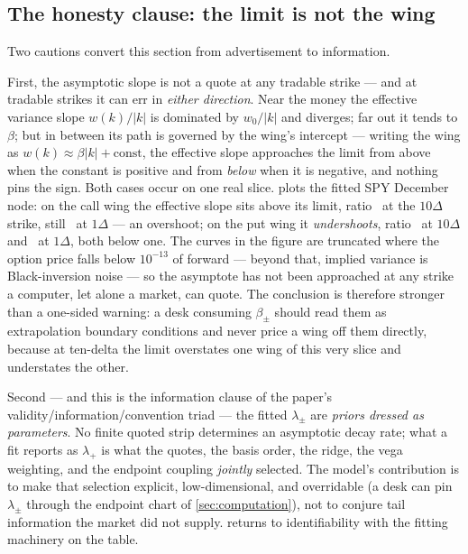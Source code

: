 \subsection{The honesty clause: the limit is not the wing}

Two cautions convert this section from advertisement to information.

First, the asymptotic slope is not a quote at any tradable strike ---
and at tradable strikes it can err in \emph{either direction}.  Near the
money the effective variance slope $w(k)/|k|$ is dominated by $w_0/|k|$
and diverges; far out it tends to $\beta$; but in between its path is
governed by the wing's intercept --- writing the wing as
$w(k)\approx\beta|k|+\text{const}$, the effective slope approaches the
limit from above when the constant is positive and from \emph{below}
when it is negative, and nothing pins the sign.  Both cases occur on one
real slice.   plots the fitted SPY December node: on the
call wing the effective slope sits above its limit, ratio
\MacLeeRatioTenDeltaCall\ at the $10\Delta$ strike, still
\MacLeeRatioOneDeltaCall\ at $1\Delta$ --- an overshoot; on the put wing
it \emph{undershoots}, ratio \MacLeeRatioTenDeltaPut\ at $10\Delta$ and
\MacLeeRatioOneDeltaPut\ at $1\Delta$, both below one.  The curves in
the figure are truncated where the option price falls below $10^{-13}$
of forward --- beyond that, implied variance is Black-inversion noise
--- so the asymptote has not been approached at any strike a computer,
let alone a market, can quote.  The conclusion is therefore stronger
than a one-sided warning: a desk consuming $\beta_\pm$ should read them
as extrapolation boundary conditions and never price a wing off them
directly, because at ten-delta the limit overstates one wing of this
very slice and understates the other.

Second --- and this is the information clause of the paper's
validity/information/convention triad --- the fitted $\lambda_\pm$ are
\emph{priors dressed as parameters}.  No finite quoted strip determines an
asymptotic decay rate; what a fit reports as $\lambda_+$ is what the
quotes, the basis order, the ridge, the vega weighting, and the endpoint
coupling \emph{jointly} selected.  The model's contribution is to make
that selection explicit, low-dimensional, and overridable (a desk can pin
$\lambda_\pm$ through the endpoint chart of \cref{sec:computation}), not
to conjure tail information the market did not supply.
 returns to identifiability with the fitting
machinery on the table.

